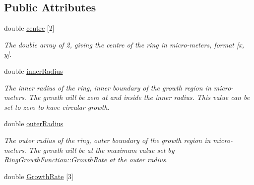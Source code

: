 \subsection*{Public Attributes}
\begin{DoxyCompactItemize}
\item 
\hypertarget{classRingGrowthFunction_a5b8f1cc72d03907bb1492e6c2f288db0}{}double \hyperlink{classRingGrowthFunction_a5b8f1cc72d03907bb1492e6c2f288db0}{centre} \mbox{[}2\mbox{]}\label{classRingGrowthFunction_a5b8f1cc72d03907bb1492e6c2f288db0}

\begin{DoxyCompactList}\small\item\em The double array of 2, giving the centre of the ring in micro-\/meters, format \mbox{[}x, y\mbox{]}. \end{DoxyCompactList}\item 
\hypertarget{classRingGrowthFunction_a4e8796fbbbe9fe18c2dcd04613effcf0}{}double \hyperlink{classRingGrowthFunction_a4e8796fbbbe9fe18c2dcd04613effcf0}{inner\+Radius}\label{classRingGrowthFunction_a4e8796fbbbe9fe18c2dcd04613effcf0}

\begin{DoxyCompactList}\small\item\em The inner radius of the ring, inner boundary of the growth region in micro-\/meters. The growth will be zero at and inside the inner radius. This value can be set to zero to have circular growth. \end{DoxyCompactList}\item 
\hypertarget{classRingGrowthFunction_a8b7d5268d9d47f112b56feef58193649}{}double \hyperlink{classRingGrowthFunction_a8b7d5268d9d47f112b56feef58193649}{outer\+Radius}\label{classRingGrowthFunction_a8b7d5268d9d47f112b56feef58193649}

\begin{DoxyCompactList}\small\item\em The outer radius of the ring, outer boundary of the growth region in micro-\/meters. The growth will be at the maximum value set by \hyperlink{classRingGrowthFunction_a93b70ff6a7258c73a6bd2d888d09fc09}{Ring\+Growth\+Function\+::\+Growth\+Rate} at the outer radius. \end{DoxyCompactList}\item 
\hypertarget{classRingGrowthFunction_a93b70ff6a7258c73a6bd2d888d09fc09}{}double \hyperlink{classRingGrowthFunction_a93b70ff6a7258c73a6bd2d888d09fc09}{Growth\+Rate} \mbox{[}3\mbox{]}\label{classRingGrowthFunction_a93b70ff6a7258c73a6bd2d888d09fc09}


\end{DoxyCompactItemize}
